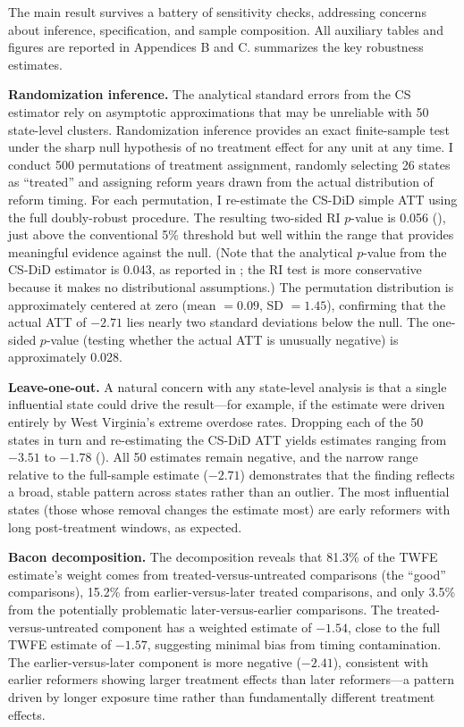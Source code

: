 \documentclass[12pt]{article}
\begin{document}
The main result survives a battery of sensitivity checks, addressing concerns about inference, specification, and sample composition. All auxiliary tables and figures are reported in Appendices B and C.  summarizes the key robustness estimates.

\textbf{Randomization inference.} The analytical standard errors from the CS estimator rely on asymptotic approximations that may be unreliable with 50 state-level clusters. Randomization inference provides an exact finite-sample test under the sharp null hypothesis of no treatment effect for any unit at any time. I conduct 500 permutations of treatment assignment, randomly selecting 26 states as ``treated'' and assigning reform years drawn from the actual distribution of reform timing. For each permutation, I re-estimate the CS-DiD simple ATT using the full doubly-robust procedure. The resulting two-sided RI $p$-value is 0.056 (), just above the conventional 5\% threshold but well within the range that provides meaningful evidence against the null. (Note that the analytical $p$-value from the CS-DiD estimator is 0.043, as reported in ; the RI test is more conservative because it makes no distributional assumptions.) The permutation distribution is approximately centered at zero (mean $= 0.09$, SD $= 1.45$), confirming that the actual ATT of $-2.71$ lies nearly two standard deviations below the null. The one-sided $p$-value (testing whether the actual ATT is unusually negative) is approximately 0.028.

\textbf{Leave-one-out.} A natural concern with any state-level analysis is that a single influential state could drive the result---for example, if the estimate were driven entirely by West Virginia's extreme overdose rates. Dropping each of the 50 states in turn and re-estimating the CS-DiD ATT yields estimates ranging from $-3.51$ to $-1.78$ (). All 50 estimates remain negative, and the narrow range relative to the full-sample estimate ($-2.71$) demonstrates that the finding reflects a broad, stable pattern across states rather than an outlier. The most influential states (those whose removal changes the estimate most) are early reformers with long post-treatment windows, as expected.

\textbf{Bacon decomposition.} The \citet{goodman2021difference} decomposition reveals that 81.3\% of the TWFE estimate's weight comes from treated-versus-untreated comparisons (the ``good'' comparisons), 15.2\% from earlier-versus-later treated comparisons, and only 3.5\% from the potentially problematic later-versus-earlier comparisons. The treated-versus-untreated component has a weighted estimate of $-1.54$, close to the full TWFE estimate of $-1.57$, suggesting minimal bias from timing contamination. The earlier-versus-later component is more negative ($-2.41$), consistent with earlier reformers showing larger treatment effects than later reformers---a pattern driven by longer exposure time rather than fundamentally different treatment effects.
\end{document}
